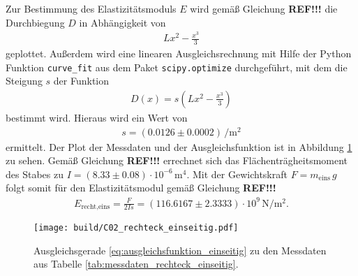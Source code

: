 \noindent
Zur Bestimmung des Elastizitätsmoduls $E$ wird gemäß Gleichung \textbf{REF!!!} die Durchbiegung $D$ in Abhängigkeit von 
\begin{align*}
    L x^2 - \frac{x^3}{3}
\end{align*}
geplottet.
Außerdem wird eine linearen Ausgleichsrechnung mit Hilfe der Python \cite[]{python} Funktion \texttt{curve\_fit} aus dem Paket
\texttt{scipy.optimize} \cite[]{scipy} durchgeführt, mit dem die Steigung $s$ der Funktion 
\begin{align}
    D(x) = s \left(L x^2 - \frac{x^3}{3}\right)
    \label{eq:ausgleichsfunktion_einseitig}
\end{align}
bestimmt wird.
Hieraus wird ein Wert von 
\begin{align*}
    s = (\num{0.0126} \pm \num{0.0002}) \, \unit{\per\meter^2}
\end{align*}
ermittelt.
Der Plot der Messdaten und der Ausgleichsfunktion ist in Abbildung \ref{fig:plot_rechteck_einseitig} zu sehen.
Gemäß Gleichung \textbf{REF!!!} errechnet sich das Flächenträgheitsmoment des Stabes zu 
$I = (\num{8.33} \pm \num{0.08}) \cdot 10^{-6} \, \unit{\meter^4}$.
Mit der Gewichtskraft $F = m_\text{eins} \, g$ folgt somit für den Elastizitätsmodul gemäß Gleichung \textbf{REF!!!}
\begin{align}
    E_\text{recht,eins} = \frac{F}{2 I s} = (\num{116.6167} \pm \num{2.3333}) \cdot 10^9 \, \unit{\newton\per\meter^2}.
\end{align}

\begin{figure}[H]
    \centering
    \texttt{[image: build/C02\_rechteck\_einseitig.pdf]}
    \caption{Ausgleichsgerade \eqref{eq:ausgleichsfunktion_einseitig} zu den Messdaten aus Tabelle \ref{tab:messdaten_rechteck_einseitig}.}
    \label{fig:plot_rechteck_einseitig}
\end{figure}